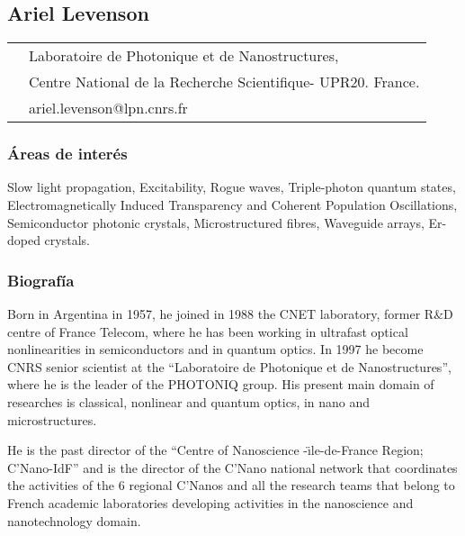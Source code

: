 \subsection*{Ariel Levenson}

\begin{tabular}{ l l}
{\multirow{3}{*}{\texttt{[image: levenson]}}} &
Laboratoire de Photonique et de Nanostructures, \\
 & Centre National de la Recherche Scientifique- UPR20. France.\\
 & ariel.levenson@lpn.cnrs.fr 
\end{tabular}

\subsubsection*{Áreas de inter\'es}
Slow light propagation, Excitability, Rogue waves, Triple-photon quantum states,
Electromagnetically Induced Transparency and Coherent Population Oscillations,
Semiconductor photonic crystals, Microstructured fibres, Waveguide arrays,
Er-doped crystals.

\subsubsection*{Biograf\'ia}

Born in Argentina in 1957, he joined in 1988 the CNET laboratory, former R\&D
centre of France Telecom, where he has been working in ultrafast optical
nonlinearities in semiconductors and in quantum optics. In 1997 he become CNRS
senior scientist at the ``Laboratoire de Photonique et de Nanostructures'',
where he is the leader of the PHOTONIQ group. His present main domain of
researches is classical, nonlinear and quantum optics, in nano and
microstructures. 

He is the past director of the ``Centre of Nanoscience -\"\i le-de-France
Region;  C'Nano-IdF'' and is the director of the C'Nano national network that
coordinates the activities of the 6 regional C'Nanos and all the research teams
that belong to French academic laboratories developing activities in the
nanoscience and nanotechnology domain.